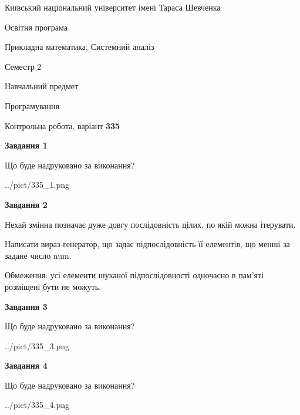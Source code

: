 \documentclass[12pt, ukrainian]{article}
\begin{document}
{{\begin {small}\par
{ \center  Київський національний університет імені Тараса Шевченка \par}
{\parbox {5 cm}{Освітня програма \hfill}{\parbox {8 cm}{Прикладна математика, Системний аналіз \hfill}}\parbox {5 cm}{\hfill Семестр 2}}\par
{\parbox {5 cm} {Навчальний предмет \hfill}\parbox {7 cm}{Програмування \hfill}\parbox {6cm}{\hfill}\par}\vspace{-7pt} \end{small}}{\center Контрольна робота, варіант  \No \textbf
{ 335 }\par}}
{
\begin {large}
{\begin {center}\textbf{Завдання 1}\end {center}}\par
Що буде надруковано за виконання?\par\par
\begin{center}
	{../pict/335_1.png}
\end{center}
\newpage

{\begin {center}\textbf{Завдання 2}\end {center}}\par
Нехай змінна  позначає дуже довгу послідовність цілих, по якій можна ітерувати.

Написати вираз-генератор, що задає підпослідовність її елементів, що менші за задане число num.

Обмеження: усі елементи шуканої підпослідовності одночасно в пам'яті розміщені бути не можуть.\par
\newpage

{\begin {center}\textbf{Завдання 3}\end {center}}\par
Що буде надруковано за виконання?
\begin{center}
	{../pict/335_3.png}
\end{center}
\newpage

{\begin {center}\textbf{Завдання 4}\end {center}}\par
Що буде надруковано за виконання?\par
\begin{center}
	{../pict/335_4.png}
\end{center}
\newpage


\end{large}}
\end{document}
